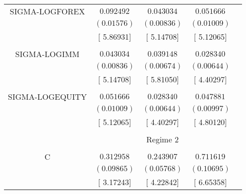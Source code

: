 \begin{tabular}{lrrrr}
\multicolumn{1}{c}{SIGMA-LOGFOREX}&\multicolumn{1}{c}{$0.092492$}&\multicolumn{1}{c}{$0.043034$}&\multicolumn{1}{c}{$0.051666$}&\multicolumn{1}{c}{}\\
\multicolumn{1}{c}{}&\multicolumn{1}{c}{$(0.01576)$}&\multicolumn{1}{c}{$(0.00836)$}&\multicolumn{1}{c}{$(0.01009)$}&\multicolumn{1}{c}{}\\
\multicolumn{1}{c}{}&\multicolumn{1}{c}{[ 5.86931]}&\multicolumn{1}{c}{[ 5.14708]}&\multicolumn{1}{c}{[ 5.12065]}&\multicolumn{1}{c}{}\\
\multicolumn{1}{c}{}&\multicolumn{1}{c}{}&\multicolumn{1}{c}{}&\multicolumn{1}{c}{}&\multicolumn{1}{c}{}\\
\multicolumn{1}{c}{SIGMA-LOGIMM}&\multicolumn{1}{c}{$0.043034$}&\multicolumn{1}{c}{$0.039148$}&\multicolumn{1}{c}{$0.028340$}&\multicolumn{1}{c}{}\\
\multicolumn{1}{c}{}&\multicolumn{1}{c}{$(0.00836)$}&\multicolumn{1}{c}{$(0.00674)$}&\multicolumn{1}{c}{$(0.00644)$}&\multicolumn{1}{c}{}\\
\multicolumn{1}{c}{}&\multicolumn{1}{c}{[ 5.14708]}&\multicolumn{1}{c}{[ 5.81050]}&\multicolumn{1}{c}{[ 4.40297]}&\multicolumn{1}{c}{}\\
\multicolumn{1}{c}{}&\multicolumn{1}{c}{}&\multicolumn{1}{c}{}&\multicolumn{1}{c}{}&\multicolumn{1}{c}{}\\
\multicolumn{1}{c}{SIGMA-LOGEQUITY}&\multicolumn{1}{c}{$0.051666$}&\multicolumn{1}{c}{$0.028340$}&\multicolumn{1}{c}{$0.047881$}&\multicolumn{1}{c}{}\\
\multicolumn{1}{c}{}&\multicolumn{1}{c}{$(0.01009)$}&\multicolumn{1}{c}{$(0.00644)$}&\multicolumn{1}{c}{$(0.00997)$}&\multicolumn{1}{c}{}\\
\multicolumn{1}{c}{}&\multicolumn{1}{c}{[ 5.12065]}&\multicolumn{1}{c}{[ 4.40297]}&\multicolumn{1}{c}{[ 4.80120]}&\multicolumn{1}{c}{}\\
[4.5pt] \hline \\ [-4.5pt]
\multicolumn{1}{c}{}&\multicolumn{3}{c}{Regime 2}&\multicolumn{1}{c}{}\\
[4.5pt] \hline \\ [-4.5pt]
\multicolumn{1}{c}{C}&\multicolumn{1}{c}{$0.312958$}&\multicolumn{1}{c}{$0.243907$}&\multicolumn{1}{c}{$0.711619$}&\multicolumn{1}{c}{}\\
\multicolumn{1}{c}{}&\multicolumn{1}{c}{$(0.09865)$}&\multicolumn{1}{c}{$(0.05768)$}&\multicolumn{1}{c}{$(0.10695)$}&\multicolumn{1}{c}{}\\
\multicolumn{1}{c}{}&\multicolumn{1}{c}{[ 3.17243]}&\multicolumn{1}{c}{[ 4.22842]}&\multicolumn{1}{c}{[ 6.65358]}&\multicolumn{1}{c}{}\\

\end{tabular}
